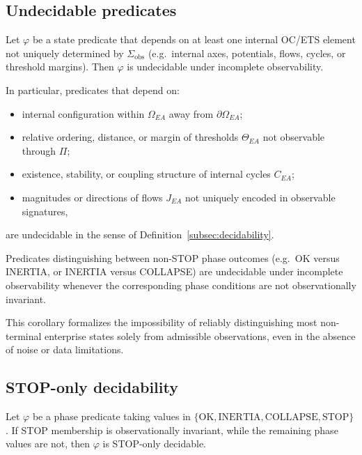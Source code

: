 \subsection{Undecidable predicates}
\label{subsec:undecidable-predicates}

\begin{theorem}
\label{thm:structural-undecidability}
Let $\varphi$ be a state predicate that depends on at least one internal
OC/ETS element not uniquely determined by $\Sigma_{\mathrm{obs}}$
(e.g.\ internal axes, potentials, flows, cycles, or threshold margins).
Then $\varphi$ is undecidable under incomplete observability.
\end{theorem}

\noindent
In particular, predicates that depend on:
\begin{itemize}
\item internal configuration within $\Omega_{EA}$ away from
      $\partial\Omega_{EA}$;
\item relative ordering, distance, or margin of thresholds
      $\Theta_{EA}$ not observable through $\Pi$;
\item existence, stability, or coupling structure of internal cycles
      $C_{EA}$;
\item magnitudes or directions of flows $J_{EA}$ not uniquely encoded in
      observable signatures,
\end{itemize}
are undecidable in the sense of
Definition~\ref{subsec:decidability}.

\begin{corollary}
\label{cor:nonterminal-undecidability}
Predicates distinguishing between non-STOP phase outcomes (e.g.\ OK
versus INERTIA, or INERTIA versus COLLAPSE) are undecidable under
incomplete observability whenever the corresponding phase conditions
are not observationally invariant.
\end{corollary}

\noindent
This corollary formalizes the impossibility of reliably distinguishing
most non-terminal enterprise states solely from admissible
observations, even in the absence of noise or data limitations.

\subsection{STOP-only decidability}
\label{subsec:stop-only-decidability}

\begin{theorem}
\label{thm:stop-only}
Let $\varphi$ be a phase predicate taking values in
$\{\text{OK}, \text{INERTIA}, \text{COLLAPSE}, \text{STOP}\}$.
If STOP membership is observationally invariant, while the remaining
phase values are not, then $\varphi$ is STOP-only decidable.
\end{theorem}

